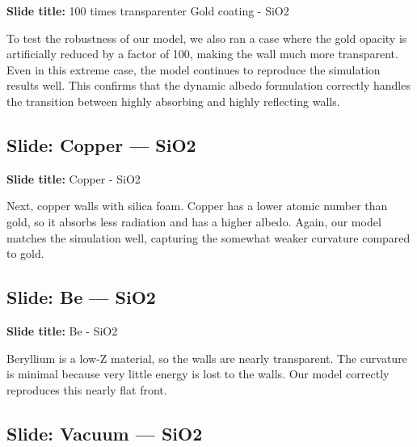 \documentclass[12pt, a4paper]{article}
\begin{document}
\begin{slidebox}
\textbf{Slide title:} 100 times transparenter Gold coating - SiO2
\end{slidebox}

To test the robustness of our model, we also ran a case where the gold opacity is artificially reduced by a factor of 100, making the wall much more transparent. Even in this extreme case, the model continues to reproduce the simulation results well. This confirms that the dynamic albedo formulation correctly handles the transition between highly absorbing and highly reflecting walls.

\subsection{Slide: Copper --- SiO2}

\begin{slidebox}
\textbf{Slide title:} Copper - SiO2
\end{slidebox}

Next, copper walls with silica foam. Copper has a lower atomic number than gold, so it absorbs less radiation and has a higher albedo. Again, our model matches the simulation well, capturing the somewhat weaker curvature compared to gold.

\subsection{Slide: Be --- SiO2}

\begin{slidebox}
\textbf{Slide title:} Be - SiO2
\end{slidebox}

Beryllium is a low-Z material, so the walls are nearly transparent. The curvature is minimal because very little energy is lost to the walls. Our model correctly reproduces this nearly flat front.

\subsection{Slide: Vacuum --- SiO2}
\end{document}
